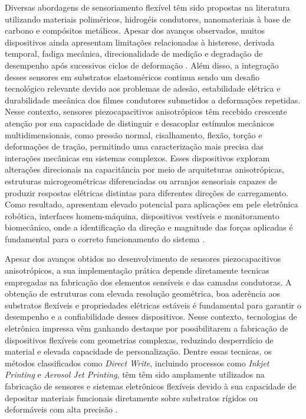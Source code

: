 Diversas abordagens de sensoriamento flexível têm sido propostas na literatura utilizando materiais poliméricos, hidrogéis condutores, nanomateriais
à base de carbono e compósitos metálicos. Apesar dos avanços observados, muitos dispositivos ainda apresentam limitações relacionadas
à histerese, derivada temporal, fadiga mecânica, direcionalidade de medição e degradação de desempenho após sucessivos ciclos de deformação \cite{Cheng2022} \cite{Koivikko2018} \cite{Ali2018}.
Além disso, a integração desses sensores em substratos elastoméricos continua sendo um desafio tecnológico relevante devido aos problemas de adesão, 
estabilidade elétrica e durabilidade mecânica dos filmes condutores submetidos a deformações repetidas.
Nesse contexto, sensores piezocapacitivos anisotrópicos têm recebido crescente atenção por sua capacidade de distinguir e desacoplar estímulos mecânicos 
multidimensionais, como pressão normal, cisalhamento, flexão, torção e deformações de tração, permitindo uma caracterização mais precisa das interações 
mecânicas em sistemas complexos. Esses dispositivos exploram alterações direcionais na capacitância por meio de arquiteturas anisotrópicas, estruturas 
microgeométricas diferenciadas ou arranjos sensoriais capazes de produzir respostas elétricas distintas para diferentes direções de carregamento. Como 
resultado, apresentam elevado potencial para aplicações em pele eletrônica robótica, interfaces homem-máquina, dispositivos vestíveis e monitoramento 
biomecânico, onde a identificação da direção e magnitude das forças aplicadas é fundamental para o correto funcionamento do sistema \cite{WOS:001403456400001}.

Apesar dos avanços obtidos no desenvolvimento de sensores piezocapacitivos anisotrópicos, a sua implementação prática depende diretamente tecnicas empregadas na
fabricação dos elementos sensíveis e das camadas condutoras. A obtenção de estruturas com elevada resolução geométrica, boa aderência aos substratos flexíveis e 
propriedades elétricas estáveis é fundamental para garantir o desempenho e a confiabilidade desses dispositivos. Nesse contexto, tecnologias de eletrônica impressa
vêm ganhando destaque por possibilitarem a fabricação de dispositivos flexíveis com geometrias complexas, reduzindo desperrdício de material e elevada capacidade de personalização.
Dentre essas tecnicas, os métodos classificados como \textit{Direct Write}, incluindo processos como \textit{Inkjet Printing} e \textit{Aerosol Jet Printing}, têm 
têm sido amplamente utilizados na fabricação de sensores e sistemas eletrônicos flexíveis devido à sua capacidade de depositar materiais funcionais diretamente sobre 
substratos rígidos ou deformáveis com alta precisão \cite{Zhang2021DirectInkWriting}.

